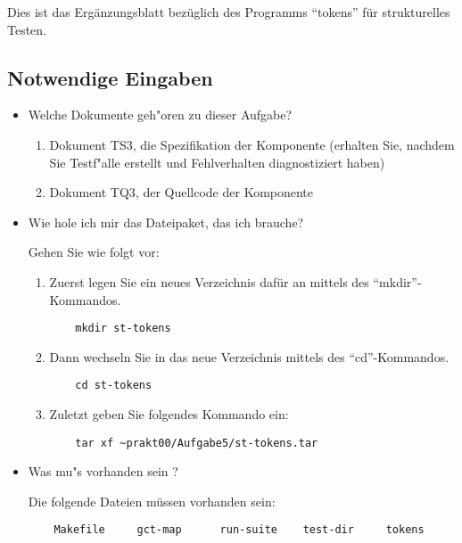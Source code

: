 
Dies ist das Erg\"anzungsblatt bez\"uglich des Programms "`tokens"'
f\"ur strukturelles Testen.

\subsection*{Notwendige Eingaben}

\begin{itemize}

\item Welche Dokumente geh"oren zu dieser Aufgabe?

\begin{enumerate}
\item Dokument TS3, die Spezifikation der Komponente (erhalten Sie, nachdem
   Sie Testf"alle erstellt und Fehlverhalten diagnostiziert haben)
\item Dokument TQ3, der Quellcode der Komponente
\end{enumerate}

\item Wie hole ich mir das Dateipaket, das ich brauche?

Gehen Sie wie folgt vor:

\begin{enumerate}

\item Zuerst legen Sie ein neues Verzeichnis daf\"ur an mittels des 
"`mkdir"'-Kommandos.
\begin{verbatim}
    mkdir st-tokens
\end{verbatim}

\item Dann wechseln Sie in das neue Verzeichnis mittels des 
"`cd"'-Kommandos.
\begin{verbatim}
    cd st-tokens
\end{verbatim}

\item Zuletzt geben Sie folgendes Kommando ein:
\begin{verbatim}
    tar xf ~prakt00/Aufgabe5/st-tokens.tar
\end{verbatim}

\end{enumerate}

\item Was mu"s vorhanden sein ?

Die folgende Dateien m\"ussen vorhanden sein:
\begin{verbatim}
    Makefile     gct-map      run-suite    test-dir     tokens
\end{verbatim}

% 
% 

\end{itemize}


